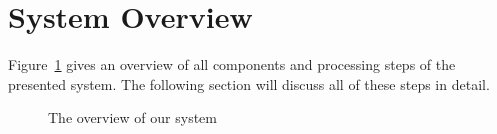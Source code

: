 \documentclass{article}
\begin{document}


\section{System Overview}
Figure~\ref{fig:overview} gives an overview of all components and processing steps of the presented system. The following section will discuss all of these steps in detail.
\begin{figure}
 \centerline{}
 \caption{The overview of our system}
 \label{fig:overview}
\end{figure}
\end{document}
